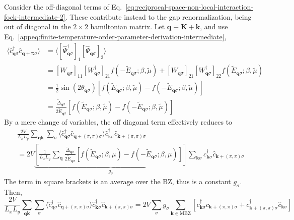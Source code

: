Consider the off-diagonal terms of Eq.~\eqref{eq:reciprocal-space-non-local-interaction-fock-intermediate-2}. These contribute instead to the gap renormalization, being out of diagonal in the $2\times2$ hamiltonian matrix. Let $\mathbf{q}\equiv\mathbf{K}+\mathbf{k}$, and use Eq.~\eqref{appeq:finite-temperature-order-parameter-derivation-intermediate},
\[
\begin{aligned}
	\langle
		\hat c_{\mathbf{q}\sigma}^\dagger 
		\hat c_{\mathbf{q}+\bm{\pi} \sigma}
	\rangle &= \langle 
		[
			\hat \Psi_{\mathbf{q}\sigma}^\dagger
		]_1 [
			\hat \Psi_{\mathbf{q}\sigma}
		]_2
	\rangle \\
	&= [
		W_{\mathbf{q}\sigma}
	]_{1 1} [
		W_{\mathbf{q}\sigma}^\dagger
	]_{2 1} f\left(
		-\tilde{E}_{\mathbf{q}\sigma}; \beta,\tilde{\mu}
	\right) + [
		W_{\mathbf{q}\sigma}
	]_{2 1} [
		W_{\mathbf{q}\sigma}^\dagger
	]_{2 2} f\left(
		\tilde{E}_{\mathbf{q}\sigma}; \beta,\tilde{\mu}
	\right) \\
	&= \frac{1}{2} \sin \left(2\theta_{\mathbf{q}\sigma}\right) \left[
		f\left(
			\tilde{E}_{\mathbf{q}\sigma}; \beta,\tilde{\mu}
		\right) - f\left(
			-\tilde{E}_{\mathbf{q}\sigma}; \beta,\tilde{\mu}
		\right)
	\right] \\
	&= \frac{\tilde{\Delta}_{\mathbf{q}\sigma}}{2\tilde{E}_{\mathbf{q}\sigma}} \left[
		f\left(
			\tilde{E}_{\mathbf{q}\sigma}; \beta,\tilde{\mu}
		\right) - f\left(
			-\tilde{E}_{\mathbf{q}\sigma}; \beta,\tilde{\mu}
		\right)
	\right]
\end{aligned}
\]
By a mere change of variables, the off diagonal term effectively reduces to
\begin{multline*}
	\frac{2V}{L_xL_y} \sum_{\mathbf{q}\mathbf{k}} \sum_\sigma \langle \hat
	c_{\mathbf{q}\sigma}^\dagger \hat c_{\mathbf{q}+(\pi,\pi)\sigma} 
	\rangle \hat c_{\mathbf{k}\sigma}^\dagger \hat c_{\mathbf{k}+(\pi,\pi)\sigma} \\ = 2V
	\underbrace{ 
		\left[
			\frac{1}{L_xL_y}
			\sum_{\mathbf{q}}\frac{\tilde{\Delta}_{\mathbf{q}\sigma}}{2\tilde{E}_{\mathbf{q}\sigma}} \left[
				f(\tilde{E}_{\mathbf{q}\sigma};\beta,\mu) - 		f(-\tilde{E}_{\mathbf{q}\sigma};\beta,\mu)
			\right]
		\right]
	}_{g_\sigma}
	\sum_{\mathbf{k}\sigma} c_{\mathbf{k}\sigma}^\dagger \hat c_{\mathbf{k}+(\pi,\pi)\sigma}
\end{multline*}
The term in square brackets is an average over the BZ, thus is a constant $g_\sigma$. Then,
\[
	\frac{2V}{L_xL_y} \sum_{\mathbf{q}\mathbf{k}} \sum_\sigma \langle \hat c_{\mathbf{q}\sigma}^\dagger \hat c_{\mathbf{q}+(\pi,\pi)\sigma} \rangle \hat c_{\mathbf{k}\sigma}^\dagger \hat c_{\mathbf{k}+(\pi,\pi)\sigma} = 2V \sum_\sigma g_\sigma \sum_{\mathbf{k}\in\mathrm{MBZ}} \left[
		c_{\mathbf{k}\sigma}^\dagger \hat c_{\mathbf{k}+(\pi,\pi)\sigma} + c_{\mathbf{k}+(\pi,\pi)\sigma}^\dagger \hat c_{\mathbf{k}\sigma}
	\right]
\]
